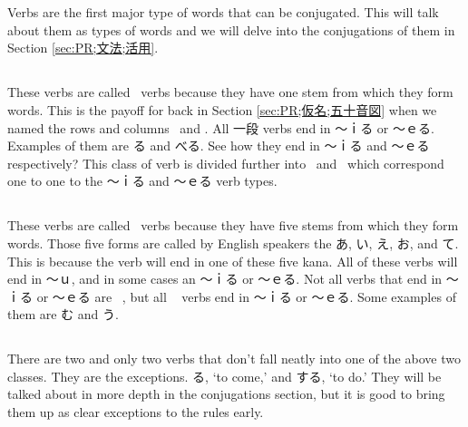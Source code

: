\section[動詞]{}\label{sec:PR;文法;動詞}

Verbs are the first major type of words that can be conjugated. This will talk about them as types of words and we will delve into the conjugations of them in Section \ref{sec:PR;文法;活用}. 

\subsection*{}\label{ssec:PR;文法;動詞;一段動詞}

These verbs are called ~verbs because they have one stem from which they form words. This is the payoff for back in Section \ref{sec:PR;仮名;五十音図} when we named the rows and columns ~and . All 一段 verbs end in 〜ｉる or 〜ｅる. Examples of them are る and べる. See how they end in 〜ｉる and 〜ｅる respectively? This class of verb is divided further into ~and ~which correspond one to one to the 〜ｉる and 〜ｅる verb types.

\subsection*{}\label{ssec:PR;文法;動詞;五段動詞}

These verbs are called ~verbs because they have five stems from which they form words. Those five forms are called by English speakers the あ, い, え, お, and て. This is because the verb will end in one of these five kana. All of these verbs will end in 〜ｕ, and in some cases an 〜ｉる or 〜ｅる. Not all verbs that end in 〜ｉる or 〜ｅる are ~, but all ~ verbs end in 〜ｉる or 〜ｅる. Some examples of them are む and う.

\subsection*{}\label{ssec:PR;文法;動詞;変格動詞}

There are two and only two verbs that don't fall neatly into one of the above two classes. They are the exceptions. る, `to come,' and する, `to do.' They will be talked about in more depth in the conjugations section, but it is good to bring them up as clear exceptions to the rules early.